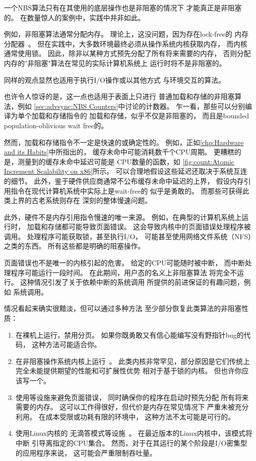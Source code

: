一个NBS算法只有在其使用的底层操作也是非阻塞的情况下
才能真正是非阻塞的。
在数量惊人的案例中，实践中并非如此。

例如，非阻塞算法通常分配内存。
理论上，这没问题，因为存在lock-free的
内存分配器~\cite{MagedMichael04NBSmalloc}。
但在实践中，大多数环境最终必须从操作系统内核获取内存，
而内核通常使用锁。
因此，除非以某种方式预先分配了所有将来需要的内存，
否则分配内存的"非阻塞"算法在常见的实际计算机系统上
运行时将不是非阻塞的。

同样的观点显然也适用于执行I/O操作或以其他方式
与环境交互的算法。

也许令人惊讶的是，这一点也适用于表面上只进行
普通加载和存储的非阻塞算法，例如
\cref{sec:advsync:NBS Counters}中讨论的计数器。
乍一看，那些可以分别编译为单个加载和存储指令的
加载和存储，似乎不仅是非阻塞的，
而且是bounded population-oblivious wait free的。

然而，加载和存储指令不一定是快速的或确定性的。
例如，正如\cref{chp:Hardware and its Habits}中所指出的，
缓存未命中可能消耗数千个CPU周期。
更糟糕的是，测量到的缓存未命中延迟可能是
CPU数量的函数，如
\cref{fig:count:Atomic Increment Scalability on x86}所示。
可以合理地假设这些延迟还取决于系统互连的细节。
此外，鉴于硬件供应商通常不公布缓存未命中延迟的上界，
假设内存引用指令在现代计算机系统中实际上是wait-free的
似乎是勇敢的。
而那些可获得此类上界的古老系统则存在
深刻的整体慢速问题。

此外，硬件不是内存引用指令慢速的唯一来源。
例如，在典型的计算机系统上运行时，
加载和存储都可能导致页面错误。
这会导致内核中的页面错误处理程序被调用。
处理程序可能获取锁，甚至执行I/O，
可能甚至使用网络文件系统（NFS）之类的东西\@。
所有这些都是明确的阻塞操作。

页面错误也不是唯一的内核引起的危害。
给定的CPU可能随时被中断，
而中断处理程序可能运行一段时间。
在此期间，用户态的名义上非阻塞算法
将完全不运行。
这种情况引发了关于依赖中断的系统调用
所提供的前进保证的有趣问题，例如
系统调用。

情况看起来确实很黯淡，但可以通过多种方法
至少部分恢复此类算法的非阻塞性质：

\begin{enumerate}
\item	在裸机上运行，禁用分页。
	如果你既勇敢又有信心能编写没有野指针bug的代码，
	这种方法可能适合你。
\item	在非阻塞操作系统内核上运行~\cite{Cheriton96a}。
	此类内核非常罕见，部分原因是它们传统上
	完全未能提供期望的性能和可扩展性优势
	相对于基于锁的内核。
	但也许你应该写一个。
\item	使用等设施来避免页面错误，
	同时确保你的程序在启动时预先分配
	所有将来需要的内存。
	这可以工作得很好，但代价是内存在常见情况下
	严重未被充分利用。
	在成本受限或功耗有限的环境中，
	这种方法不太可能是可行的。
\item	使用Linux内核的
	无滴答模式等设施~\cite{JonCorbet2013NO-HZ-FULL}。
	在最近版本的Linux内核中，该模式将中断
	引导离指定的CPU集合。
	然而，对于在其运行的某个阶段是I/O密集型的应用程序来说，
	这可能会严重限制吞吐量。
\end{enumerate}

